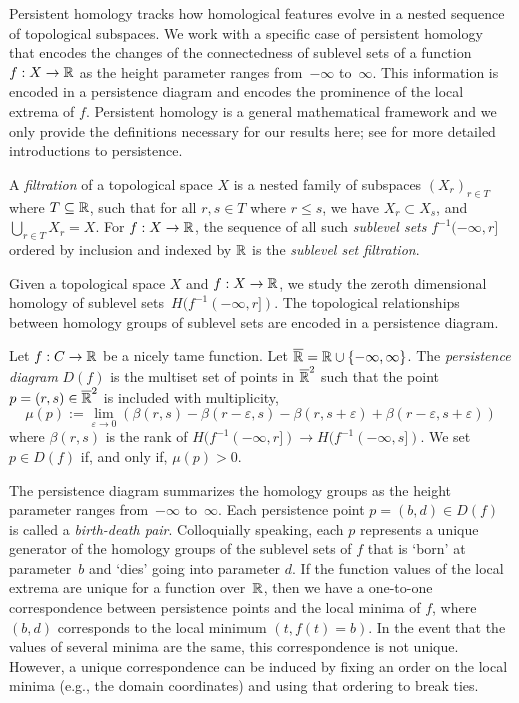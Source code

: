 Persistent homology tracks how homological  features evolve in a nested sequence
of topological subspaces.  We work with a specific case of persistent homology that
encodes the changes of the connectedness of sublevel sets of a function~$f: X
\rightarrow \mathbb{R}$ as the height parameter ranges from~$-\infty$ to~$\infty$. This
information is encoded in a persistence diagram and encodes the prominence of
the local extrema of $f$. Persistent homology is a general mathematical framework
and we only provide the definitions necessary for our results here;
see \cite{EdelsbrunnerComputational10,PereaA19} for more detailed
introductions to persistence.

A \emph{filtration} of a topological space $X$ is a nested family of subspaces
$(X_r)_{r\in T}$ where $T \subseteq \mathbb{R}$,
such that for all $r, s \in T$ where $r\leq s$, we have $X_r \subset X_s$, and $\bigcup_{r \in T} X_r = X$. For
$f: X\rightarrow \mathbb{R}$, the sequence of all such \emph{sublevel sets} $f^{-1}(-\infty, r]$ ordered by inclusion and indexed
by $\mathbb{R}$ is the \emph{sublevel set filtration}.

Given a topological space $X$ and $f: X\rightarrow \mathbb{R}$, we study the zeroth
dimensional homology of sublevel sets~$H(f^{-1}(-\infty, r])$. The topological
relationships between homology groups of sublevel sets are encoded in a
persistence diagram.

\begin{defn}\label{def:pd}
    Let $f: C\rightarrow \mathbb{R}$ be a nicely tame function. Let
    \mbox{$\overline{\mathbb{R}}=\mathbb{R} \cup \{-\infty, \infty\}$}. The \emph{persistence diagram}
    $D(f)$ is the multiset
    set of points in $\overline{\mathbb{R}}^2$ such that the point~$p = (r,
    s)\in\overline{\mathbb{R}}^2$ is included with multiplicity, 
    $$
        \mu(p) := \lim_{\varepsilon \to 0} \left( \beta(r,s) -
        \beta(r-\varepsilon,s)-\beta(r,s+\varepsilon)+\beta(r-\varepsilon,s+\varepsilon)
        \right) 
    $$
    where $\beta(r,s)$ is the
    rank of $H(f^{-1}(-\infty, r]) \to H(f^{-1}(-\infty, s])$. We set $p \in D(f)$ if, and only if, $\mu(p) >0$. 
    \end{defn}

The persistence diagram summarizes the homology
groups as the height parameter ranges from~$-\infty$ to~$\infty$.  Each
persistence point $p=(b,d)\in D(f)$ is called a \emph{birth-death pair}.
Colloquially speaking, each $p$ represents a unique generator of the
homology groups of the sublevel sets of $f$ that is `born' at parameter~$b$ and
`dies' going into parameter $d$. If the function values of the local
extrema are unique for a function over~$\mathbb{R}$,
then we have a one-to-one correspondence between
persistence points and the local minima of $f$,
where $(b,d)$ corresponds to the local minimum $(t,f(t)=b)$.
In the event that the values of several minima are the same, this correspondence is not unique. However, a unique
correspondence can be induced by fixing an order on the local minima (e.g.,
 the domain coordinates) and using
that ordering to break ties.

